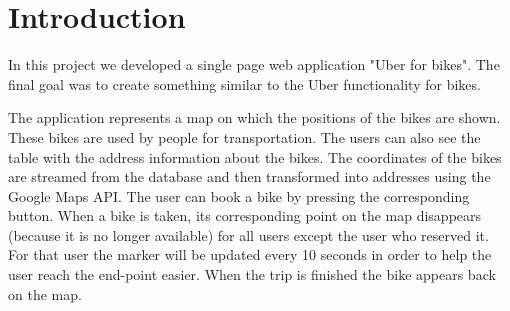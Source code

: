 \section{Introduction}

In this project we developed a single page web application "Uber for bikes". The final goal was to create something similar to the Uber functionality for bikes.

The application represents a map on which the positions of the bikes are shown. These bikes are used by people
for transportation. The users can also see the table with the address information about the bikes. The coordinates of the bikes are streamed from the database and then transformed into addresses using the Google Maps API. The user can book a bike by pressing the corresponding button. When a bike is taken, its corresponding point on the map disappears (because it is no longer available) for all users except the user who reserved it. For that user the marker will be updated every 10 seconds in order to help the user reach the end-point easier. When the trip is finished the bike appears back on the map. 
